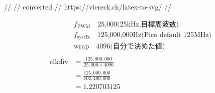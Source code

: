 //
// converted 
// https://viereck.ch/latex-to-svg/
//

\begin{align*}
& f_{\mathrm{PWM}} \quad \text{25,000(25kHz,目標周波数)} \\
& f_{\mathrm{sysclk}} \quad \text{125,000,000Hz(Pico default 125MHz)} \\
& \mathrm{wrap}    \quad \text{4096(自分で決めた値)} \\
\\
\mathrm{clkdiv} &= \frac{125,000,000}{25,000 \times 4096} \\
&= \frac{125,000,000}{102,400,000} \\
&= 1.220703125
\end{align*}